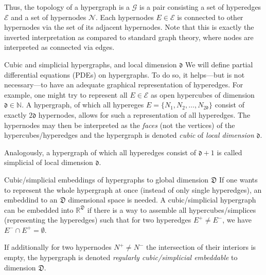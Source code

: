 \documentclass[a4paper, english, 12pt, reqno, draft]{amsart}
\makeatletter
\theoremstyle{definition}
\theoremstyle{remark}
\numberwithin{equation}{section}
\newcommand{\graph}{\ensuremath{\mathcal G}}
\newcommand{\setEdge}{\ensuremath{\mathcal E}}
\newcommand{\setNode}{\ensuremath{\mathcal N}}
\newcommand{\edge}{\ensuremath{E}}
\newcommand{\node}{\ensuremath{N}}
\newcommand{\locDim}{\ensuremath{\mathfrak d}}
\newcommand{\globDim}{\ensuremath{\mathfrak D}}
\newcommand{\IN}{\ensuremath{\mathbb N}}
\newcommand{\IR}{\ensuremath{\mathbb R}}
\def\paragraph{\@startsection{paragraph}{4}%
  \z@\z@{-\fontdimen2\font}%
  {\normalfont\scshape}}
\makeatother
\begin{document}
Thus, the topology of a hypergraph is a $\graph$ is a pair consisting a set of hyperedges $\setEdge$ and a set of hypernodes $\setNode$. Each hypernodes $\edge \in \setEdge$ is connected to other hypernodes via the set of its adjacent hypernodes. Note that this is exactly the inverted interpretation as compared to standard graph theory, where nodes are interpreted as connected via edges.

\paragraph{Cubic and simplicial hypergraphs, and local dimension $\locDim$}
% 
We will define partial differential equations (PDEs) on hypergraphs. To do so, it helps---but is not necessary---to have an adequate graphical representation of hyperedges. For example, one might try to represent all $\edge \in \setEdge$ as open hypercubes of dimension $\locDim \in \IN$. A hypergraph, of which all hypereges $\edge = \{ \node_1, \node_2, \ldots, \node_{2\locDim} \}$ consist of exactly $2\locDim$ hypernodes, allows for such a representation of all hyperedges. The hypernodes may then be interpreted as the \emph{faces} (not the vertices) of the hypercubes/hyperedges and the hypergraph is denoted \emph{cubic} of \emph{local dimension} $\locDim$.

Analogously, a hypergraph of which all hyperedges consist of $\locDim+1$ is called simplicial of local dimension $\locDim$.

\paragraph{Cubic/simplicial embeddings of hypergraphs to global dimension $\globDim$}
% 
If one wants to represent the whole hypergraph at once (instead of only single hyperedges), an embeddind to an $\globDim$ dimensional space is needed. A cubic/simplicial hypergraph can be embedded into $\IR^\globDim$ if there is a way to assemble all hypercubes/simplices (representing the hyperedges) such that for two hyperedges $\edge^+ \neq \edge^-$, we have $\edge^- \cap \edge^+ = \emptyset$.

If additionally for two hypernodes $\node^+ \neq \node^-$ the intersection of their interiors is empty, the hypergraph is denoted \emph{regularly cubic/simplicial embeddable} to dimension $\globDim$.
\end{document}
